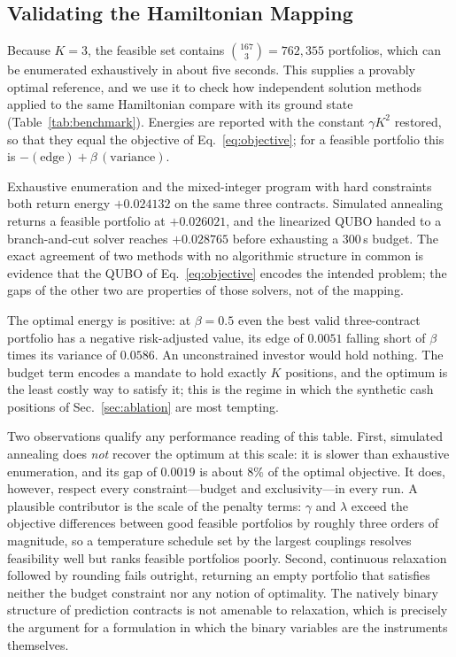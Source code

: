 \documentclass[aps, reprint, prl, twocolumn, superscriptaddress,amsmath,amssymb,noeprint]{revtex4-2}
\begin{document}
\subsection{Validating the Hamiltonian Mapping}
\label{sec:benchmark}

Because $K=3$, the feasible set contains $\binom{167}{3} = 762{,}355$
portfolios, which can be enumerated exhaustively in about five seconds.  This
supplies a provably optimal reference, and we use it to check how independent
solution methods applied to the same Hamiltonian compare with its ground state
(Table~\ref{tab:benchmark}).  Energies are reported with the constant
$\gamma K^2$ restored, so that they equal the objective of
Eq.~\eqref{eq:objective}; for a feasible portfolio this is
$-(\text{edge}) + \beta\,(\text{variance})$.

Exhaustive enumeration and the mixed-integer program with hard
constraints both return energy $+0.024132$ on the same three contracts.
Simulated annealing returns a feasible portfolio at $+0.026021$, and the
linearized QUBO handed to a branch-and-cut solver reaches $+0.028765$ before
exhausting a 300\,s budget.  The exact agreement of two methods with no
algorithmic structure in common is evidence that the QUBO of
Eq.~\eqref{eq:objective} encodes the intended problem; the gaps of the other
two are properties of those solvers, not of the mapping.

The optimal energy is positive: at $\beta = 0.5$ even the best valid
three-contract portfolio has a negative risk-adjusted value, its edge of
$0.0051$ falling short of $\beta$ times its variance of $0.0586$.  An
unconstrained investor would hold nothing.  The budget term encodes a mandate
to hold exactly $K$ positions, and the optimum is the least costly way to
satisfy it; this is the regime in which the synthetic cash positions of
Sec.~\ref{sec:ablation} are most tempting.

Two observations qualify any performance reading of this table.  First,
simulated annealing does \emph{not} recover the optimum at this scale:
it is slower than exhaustive enumeration, and its gap of $0.0019$ is about
$8\%$ of the optimal objective.  It does, however, respect every
constraint---budget and exclusivity---in every run.  A plausible contributor
is the scale of the penalty terms: $\gamma$ and $\lambda$ exceed the objective
differences between good feasible portfolios by roughly three orders of
magnitude, so a temperature schedule set by the largest couplings resolves
feasibility well but ranks feasible portfolios poorly.  Second, continuous
relaxation followed by rounding fails
outright, returning an empty portfolio that satisfies neither the budget
constraint nor any notion of optimality.  The natively binary structure of
prediction contracts is not amenable to relaxation, which is precisely the
argument for a formulation in which the binary variables are the instruments
themselves.
\end{document}
